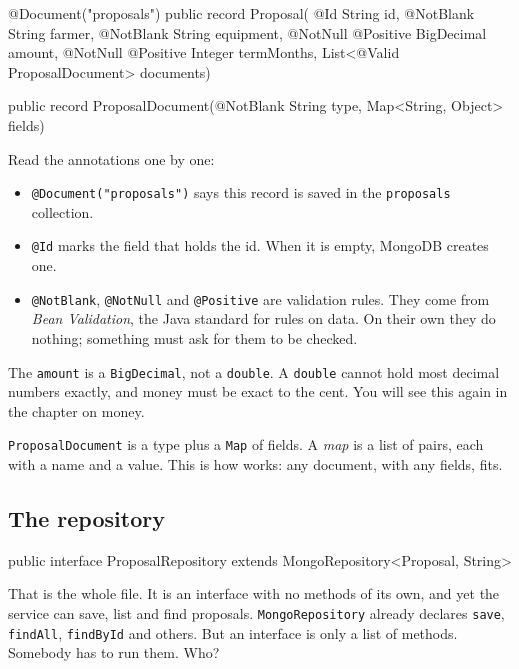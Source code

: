 \begin{code}
@Document("proposals")
public record Proposal(
        @Id String id,
        @NotBlank String farmer,
        @NotBlank String equipment,
        @NotNull @Positive BigDecimal amount,
        @NotNull @Positive Integer termMonths,
        List<@Valid ProposalDocument> documents) {
}

public record ProposalDocument(@NotBlank String type, Map<String, Object> fields) {
}
\end{code}

Read the annotations one by one:

\begin{itemize}
  \item \texttt{@Document("proposals")} says this record is saved in the
        \texttt{proposals} collection.
  \item \texttt{@Id} marks the field that holds the id. When it is empty,
        MongoDB creates one.
  \item \texttt{@NotBlank}, \texttt{@NotNull} and \texttt{@Positive} are
        validation rules. They come from \emph{Bean Validation}, the Java
        standard for rules on data. On their own they do nothing; something
        must ask for them to be checked.
\end{itemize}

The \texttt{amount} is a \texttt{BigDecimal}, not a \texttt{double}. A
\texttt{double} cannot hold most decimal numbers exactly, and money must be
exact to the cent. You will see this again in the chapter on money.

\texttt{ProposalDocument} is a type plus a \texttt{Map} of fields. A
\emph{map} is a list of pairs, each with a name and a value. This is how
 works: any document, with any fields, fits.

\subsection*{The repository}

\begin{code}
public interface ProposalRepository extends MongoRepository<Proposal, String> {
}
\end{code}

That is the whole file. It is an interface with no methods of its own, and
yet the service can save, list and find proposals. \texttt{MongoRepository}
already declares \texttt{save}, \texttt{findAll}, \texttt{findById} and
others. But an interface is only a list of methods. Somebody has to run them.
Who?

